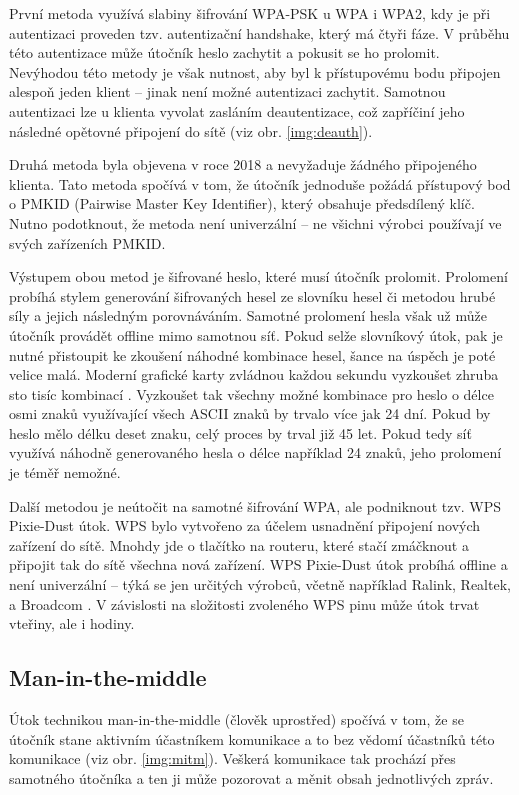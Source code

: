 První metoda využívá slabiny šifrování WPA-PSK u WPA i WPA2, kdy je při autentizaci proveden tzv. autentizační handshake, který má čtyři fáze. V průběhu této autentizace může útočník heslo zachytit a pokusit se ho prolomit. Nevýhodou této metody je však nutnost, aby byl k přístupovému bodu připojen alespoň jeden klient -- jinak není možné autentizaci zachytit. Samotnou autentizaci lze u klienta vyvolat zasláním deautentizace, což zapříčiní jeho následné opětovné připojení do sítě (viz obr. \ref{img:deauth}).

Druhá metoda byla objevena v roce 2018 a nevyžaduje žádného připojeného klienta. Tato metoda spočívá v tom, že útočník jednoduše požádá přístupový bod o PMKID (Pairwise Master Key Identifier), který obsahuje předsdílený klíč. Nutno podotknout, že metoda není univerzální -- ne všichni výrobci používají ve svých zařízeních PMKID.

Výstupem obou metod je šifrované heslo, které musí útočník prolomit. Prolomení probíhá stylem generování šifrovaných hesel ze slovníku hesel či metodou hrubé síly a jejich následným porovnáváním. Samotné prolomení hesla však už může útočník provádět offline mimo samotnou síť. Pokud selže slovníkový útok, pak je nutné přistoupit ke zkoušení náhodné kombinace hesel, šance na úspěch je poté velice malá. Moderní grafické karty zvládnou každou sekundu vyzkoušet zhruba sto tisíc kombinací \cite{alamanni2015kali}. Vyzkoušet tak všechny možné kombinace pro heslo o délce osmi znaků využívající všech ASCII znaků by trvalo více jak 24 dní. Pokud by heslo mělo délku deset znaku, celý proces by trval již 45 let. Pokud tedy síť využívá náhodně generovaného hesla o délce například 24 znaků, jeho prolomení je téměř nemožné.

Další metodou je neútočit na samotné šifrování WPA, ale podniknout tzv. WPS Pixie-Dust útok. WPS bylo vytvořeno za účelem usnadnění připojení nových zařízení do sítě. Mnohdy jde o tlačítko na routeru, které stačí zmáčknout a připojit tak do sítě všechna nová zařízení. WPS Pixie-Dust útok probíhá offline a není univerzální -- týká se jen určitých výrobců, včetně například Ralink, Realtek, a Broadcom \cite{mitnick2019art}. V závislosti na složitosti zvoleného WPS pinu může útok trvat vteřiny, ale i hodiny. 

\subsection{Man-in-the-middle}
Útok technikou man-in-the-middle (člověk uprostřed) spočívá v tom, že se útočník stane aktivním účastníkem komunikace a to bez vědomí účastníků této komunikace (viz obr. \ref{img:mitm}). Veškerá komunikace tak prochází přes samotného útočníka a ten ji může pozorovat a měnit obsah jednotlivých zpráv.

